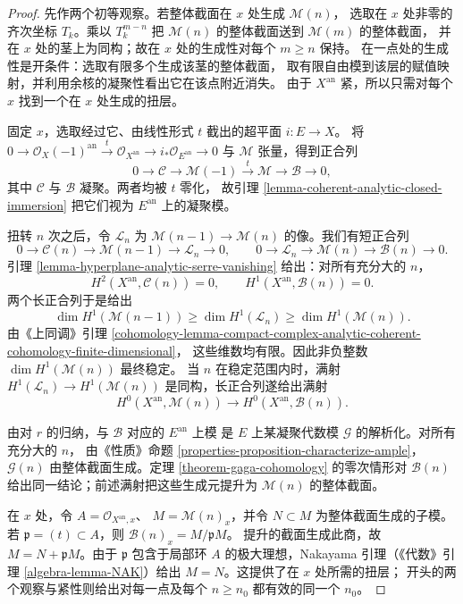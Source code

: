 \begin{proof}
先作两个初等观察。若整体截面在 $x$ 处生成 $\mathcal M(n)$，
选取在 $x$ 处非零的齐次坐标 $T_k$。乘以 $T_k^{m-n}$ 把
$\mathcal M(n)$ 的整体截面送到 $\mathcal M(m)$ 的整体截面，
并在 $x$ 处的茎上为同构；故在 $x$ 处的生成性对每个 $m\geq n$ 保持。
在一点处的生成性是开条件：选取有限多个生成该茎的整体截面，
取有限自由模到该层的赋值映射，并利用余核的凝聚性看出它在该点附近消失。
由于 $X^{\mathrm{an}}$ 紧，所以只需对每个 $x$ 找到一个在 $x$ 处生成的扭层。

固定 $x$，选取经过它、由线性形式 $t$ 截出的超平面 $i:E\to X$。
将
$0\to\mathcal O_X(-1)^{\mathrm{an}}\xrightarrow{t}
\mathcal O_{X^{\mathrm{an}}}\to i_*\mathcal O_{E^{\mathrm{an}}}\to0$
与 $\mathcal M$ 张量，得到正合列
$$
0\longrightarrow\mathcal C\longrightarrow\mathcal M(-1)
\xrightarrow{t}\mathcal M\longrightarrow\mathcal B\longrightarrow0,
$$
其中 $\mathcal C$ 与 $\mathcal B$ 凝聚。两者均被 $t$ 零化，
故引理 \ref{lemma-coherent-analytic-closed-immersion}
把它们视为 $E^{\mathrm{an}}$ 上的凝聚模。

扭转 $n$ 次之后，令 $\mathcal L_n$ 为
$\mathcal M(n-1)\to\mathcal M(n)$ 的像。我们有短正合列
$$
0\to\mathcal C(n)\to\mathcal M(n-1)\to\mathcal L_n\to0,
\qquad
0\to\mathcal L_n\to\mathcal M(n)\to\mathcal B(n)\to0.
$$
引理 \ref{lemma-hyperplane-analytic-serre-vanishing} 给出：对所有充分大的 $n$，
$$
H^2(X^{\mathrm{an}},\mathcal C(n))=0,
\qquad
H^1(X^{\mathrm{an}},\mathcal B(n))=0.
$$
两个长正合列于是给出
$$
\dim H^1(\mathcal M(n-1))
\geq\dim H^1(\mathcal L_n)
\geq\dim H^1(\mathcal M(n)).
$$
由《上同调》引理
\ref{cohomology-lemma-compact-complex-analytic-coherent-cohomology-finite-dimensional}，
这些维数均有限。因此非负整数 $\dim H^1(\mathcal M(n))$ 最终稳定。
当 $n$ 在稳定范围内时，满射
$H^1(\mathcal L_n)\to H^1(\mathcal M(n))$ 是同构，长正合列遂给出满射
$$
H^0(X^{\mathrm{an}},\mathcal M(n))
\longrightarrow H^0(X^{\mathrm{an}},\mathcal B(n)).
$$

由对 $r$ 的归纳，与 $\mathcal B$ 对应的 $E^{\mathrm{an}}$ 上模
是 $E$ 上某凝聚代数模 $\mathcal G$ 的解析化。对所有充分大的 $n$，
由《性质》命题 \ref{properties-proposition-characterize-ample}，
$\mathcal G(n)$ 由整体截面生成。定理 \ref{theorem-gaga-cohomology}
的零次情形对 $\mathcal B(n)$ 给出同一结论；前述满射把这些生成元提升为
$\mathcal M(n)$ 的整体截面。

在 $x$ 处，令 $A=\mathcal O_{X^{\mathrm{an}},x}$、
$M=\mathcal M(n)_x$，并令 $N\subset M$ 为整体截面生成的子模。
若 $\mathfrak p=(t)\subset A$，则 $\mathcal B(n)_x=M/\mathfrak pM$。
提升的截面生成此商，故 $M=N+\mathfrak pM$。由于 $\mathfrak p$
包含于局部环 $A$ 的极大理想，Nakayama 引理（《代数》引理
\ref{algebra-lemma-NAK}）给出 $M=N$。这提供了在 $x$ 处所需的扭层；
开头的两个观察与紧性则给出对每一点及每个 $n\geq n_0$ 都有效的同一个 $n_0$。
\end{proof}

